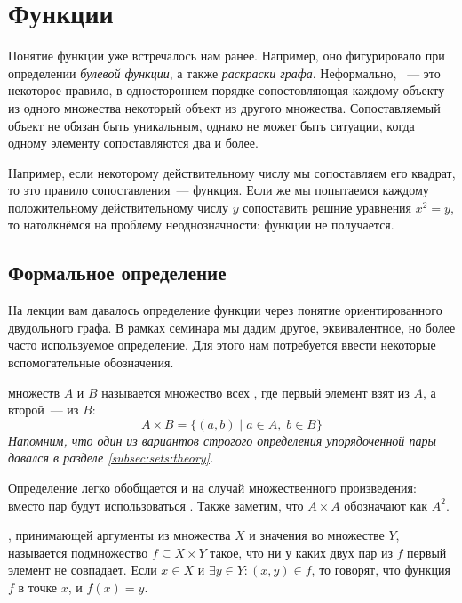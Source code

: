 \section{Функции}
\label{sec:functions}

Понятие функции уже встречалось нам ранее.
Например, оно фигурировало при определении \textit{булевой функции}, а также \textit{раскраски графа}.
Неформально, ~--- это некоторое правило, в одностороннем порядке сопостовляющая каждому объекту из одного множества некоторый объект из другого множества.
Сопоставляемый объект не обязан быть уникальным, однако не может быть ситуации, когда одному элементу сопоставляются два и более.

Например, если некоторому действительному числу мы сопоставляем его квадрат, то это правило сопоставления~--- функция.
Если же мы попытаемся каждому положительному действительному числу $ y $ сопоставить решние уравнения $ x^2 = y $, то натолкнёмся на проблему неоднозначности:
функции не получается.

\subsection{Формальное определение}
\label{subsec:functions:definition}

На лекции вам давалось определение функции через понятие ориентированного двудольного графа.
В рамках семинара мы дадим другое, эквивалентное, но более часто используемое определение.
Для этого нам потребуется ввести некоторые вспомогательные обозначения.

\begin{definition}
     множеств $ A $ и $ B $ называется множество всех , где первый элемент взят из $ A $, а второй~--- из $ B $:
    \[
        A \times B = \{ (a, b) \mid a \in A, \; b \in B \}
    \]
    \textit{Напомним, что один из вариантов строгого определения упорядоченной пары давался в разделе \ref{subsec:sets:theory}.}
\end{definition}

Определение легко обобщается и на случай множественного произведения: вместо пар будут использоваться .
Также заметим, что $ A \times A $ обозначают как $ A^2 $.

\begin{definition}
    \label{definition:functions:function}
    , принимающей аргументы из множества $ X $ и значения во множестве $ Y $,
    называется подмножество $ f \subseteq X \times Y $ такое, что ни у каких двух пар из $ f $ первый элемент не совпадает.
    \newline
    Если $ x \in X $ и $ \exists y \in Y: (x, y) \in f $, то говорят, что функция $ f $  в точке $ x $, и $ f(x) = y $.
\end{definition}

